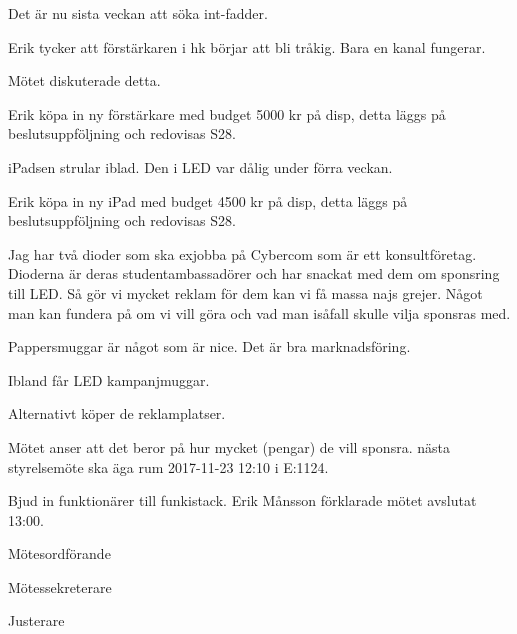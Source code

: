 \documentclass[10pt]{article}
\def\mo{Erik Månsson}
\def\ms{Johan Karlberg}
\def\ji{Sophia}
\begin{document}
\begin{paragrafer}
\begin{paragrafer}
Det är nu sista veckan att söka int-fadder.
\end{paragrafer}

Erik tycker att förstärkaren i hk börjar att bli tråkig. Bara en kanal fungerar.

Mötet diskuterade detta.

Erik \ypa köpa in ny förstärkare med budget 5000 kr på disp, detta läggs på beslutsuppföljning och redovisas S28.

\Mbaby
{}
iPadsen strular iblad. Den i LED var dålig under förra veckan.

Erik \ypa köpa in ny iPad med budget 4500 kr på disp, detta läggs på beslutsuppföljning och redovisas S28.

\Mbaby

Jag har två dioder som ska exjobba på Cybercom som är ett konsultföretag. Dioderna är deras studentambassadörer och har snackat med dem om sponsring till LED. Så gör vi mycket reklam för dem kan vi få massa najs grejer. Något man kan fundera på om vi vill göra och vad man isåfall skulle vilja sponsras med.

Pappersmuggar är något som är nice. Det är bra marknadsföring.

Ibland får LED kampanjmuggar.

Alternativt köper de reklamplatser.

Mötet anser att det beror på hur mycket (pengar) de vill sponsra.
{\Mba} nästa styrelsemöte ska äga rum 2017-11-23 12:10 i E:1124.

{\Ibfu}

Bjud in funktionärer till funkistack.
{\mo} förklarade mötet avslutat 13:00.

\end{paragrafer}

\hidesignfoot
\begin{signatures}{3}
\signature{\mo}{Mötesordförande}
\signature{\ms}{Mötessekreterare}
\signature{\ji}{Justerare}
\end{signatures}
\end{document}
